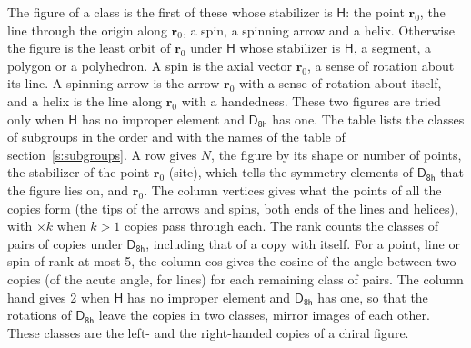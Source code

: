 \documentclass[10pt,a4paper]{article}
\numberwithin{equation}{section}
\newcommand{\grp}[1]{\mathsf{#1}}
\newcommand{\pointr}{\mathbf{r}}
\begin{document}
\leavevmode\label{n:head.figure}The figure of a class is the first of these whose stabilizer is $\grp{H}$: the point $\pointr_0$, the line through the origin along $\pointr_0$, a spin, a spinning arrow and a helix. Otherwise the figure is the least orbit of $\pointr_0$ under $\grp{H}$ whose stabilizer is $\grp{H}$, a segment, a polygon or a polyhedron. A spin is the axial vector $\pointr_0$, a sense of rotation about its line. A spinning arrow is the arrow $\pointr_0$ with a sense of rotation about itself, and a helix is the line along $\pointr_0$ with a handedness. These two figures are tried only when $\grp{H}$ has no improper element and $\grp{D_{8h}}$ has one. The table lists the classes of subgroups in the order and with the names of the table of section~\ref{s:subgroups}. \label{n:head.site}A row gives $N$, the figure by its shape or number of points, the stabilizer of the point $\pointr_0$ (site), which tells the symmetry elements of $\grp{D_{8h}}$ that the figure lies on, and $\pointr_0$. \label{n:head.vertices}The column vertices gives what the points of all the copies form (the tips of the arrows and spins, both ends of the lines and helices), with ${\times}k$ when $k > 1$ copies pass through each. \label{n:head.rank}The rank counts the classes of pairs of copies under $\grp{D_{8h}}$, including that of a copy with itself. \label{n:head.cos}For a point, line or spin of rank at most 5, the column cos gives the cosine of the angle between two copies (of the acute angle, for lines) for each remaining class of pairs. \label{n:head.hand}The column hand gives 2 when $\grp{H}$ has no improper element and $\grp{D_{8h}}$ has one, so that the rotations of $\grp{D_{8h}}$ leave the copies in two classes, mirror images of each other. These classes are the left- and the right-handed copies of a chiral figure.
\end{document}
